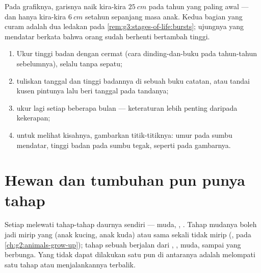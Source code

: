 \begin{example}\label{ex:g3:stages-of-life:reading}
Pada grafiknya, garisnya naik kira-kira $\qty{25}{cm}$ pada tahun yang
paling awal --- dan hanya kira-kira $\qty{6}{cm}$ setahun sepanjang
masa anak. Kedua bagian yang curam adalah dua ledakan pada
\cref{rem:g3:stages-of-life:bursts}; ujungnya yang mendatar berkata
bahwa orang  sudah berhenti bertambah tinggi.
\end{example}

\begin{method}\label{met:g3:stages-of-life:keep}
\begin{enumerate}
  \item Ukur tinggi badan dengan cermat (cara dinding-dan-buku pada
        tahun-tahun sebelumnya), selalu tanpa sepatu;
  \item tuliskan tanggal dan tinggi badannya di sebuah buku catatan,
        atau tandai kusen pintunya lalu beri tanggal pada tandanya;
  \item ukur lagi setiap beberapa bulan --- keteraturan lebih penting
        daripada kekerapan;
  \item untuk melihat kisahnya, gambarkan titik-titiknya: umur pada
        sumbu mendatar, tinggi badan pada sumbu tegak, seperti pada
        gambarnya.
\end{enumerate}
\end{method}

\section{Hewan dan tumbuhan pun punya tahap}

\begin{proposition}\label{prop:g3:stages-of-life:animals}
Setiap  melewati tahap-tahap daurnya sendiri --- muda,
, . Tahap mudanya boleh jadi mirip yang  (anak
kucing, anak kuda) atau sama sekali tidak mirip (,  pada
\cref{ch:g2:animals-grow-up}); tahap sebuah  berjalan dari
, ,  muda, sampai   yang berbunga.
Yang tidak dapat dilakukan satu pun di antaranya adalah melompati satu
tahap atau menjalankannya terbalik.
\end{proposition}
\admitted

